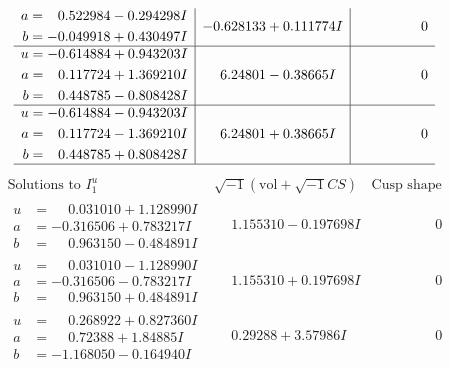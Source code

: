 \documentclass[1p]{elsarticle_modified}
\theoremstyle{definition}
\newcommand{\I}{\sqrt{-1}}
\begin{document}
$$\begin{array}{c|c|c}
\begin{aligned}
a &= \phantom{-}0.522984 - 0.294298 I \\
b &= -0.049918 + 0.430497 I\end{aligned}
 & -0.628133 + 0.111774 I & \phantom{-0.000000 } 0 \\ \hline\begin{aligned}
u &= -0.614884 + 0.943203 I \\
a &= \phantom{-}0.117724 + 1.369210 I \\
b &= \phantom{-}0.448785 - 0.808428 I\end{aligned}
 & \phantom{-}6.24801 - 0.38665 I & \phantom{-0.000000 } 0 \\ \hline\begin{aligned}
u &= -0.614884 - 0.943203 I \\
a &= \phantom{-}0.117724 - 1.369210 I \\
b &= \phantom{-}0.448785 + 0.808428 I\end{aligned}
 & \phantom{-}6.24801 + 0.38665 I & \phantom{-0.000000 } 0\\
 \hline 
 \end{array}$$\newpage$$\begin{array}{c|c|c}  
\text{Solutions to }I^u_{1}& \I (\text{vol} + \sqrt{-1}CS) & \text{Cusp shape}\\
 \hline 
\begin{aligned}
u &= \phantom{-}0.031010 + 1.128990 I \\
a &= -0.316506 + 0.783217 I \\
b &= \phantom{-}0.963150 - 0.484891 I\end{aligned}
 & \phantom{-}1.155310 - 0.197698 I & \phantom{-0.000000 } 0 \\ \hline\begin{aligned}
u &= \phantom{-}0.031010 - 1.128990 I \\
a &= -0.316506 - 0.783217 I \\
b &= \phantom{-}0.963150 + 0.484891 I\end{aligned}
 & \phantom{-}1.155310 + 0.197698 I & \phantom{-0.000000 } 0 \\ \hline\begin{aligned}
u &= \phantom{-}0.268922 + 0.827360 I \\
a &= \phantom{-}0.72388 + 1.84885 I \\
b &= -1.168050 - 0.164940 I\end{aligned}
 & \phantom{-}0.29288 + 3.57986 I & \phantom{-0.000000 } 0 \\ \hline\begin{aligned}

\end{aligned}
\end{array}$$
\end{document}
